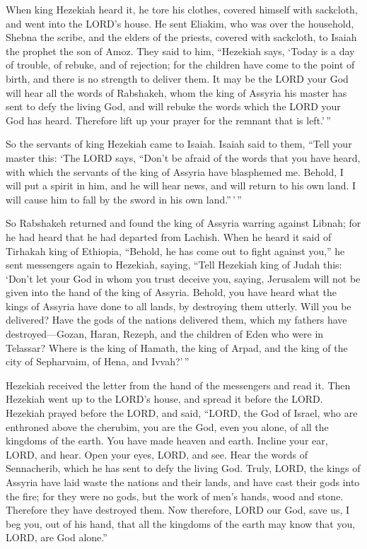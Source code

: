  When king Hezekiah heard it, he tore his clothes, covered
himself with sackcloth, and went into the LORD's house. 
He sent Eliakim, who was over the household, Shebna the scribe, and the
elders of the priests, covered with sackcloth, to Isaiah the prophet the
son of Amoz.  They said to him, ``Hezekiah says, `Today is
a day of trouble, of rebuke, and of rejection; for the children have
come to the point of birth, and there is no strength to deliver them.
 It may be the LORD your God will hear all the words of
Rabshakeh, whom the king of Assyria his master has sent to defy the
living God, and will rebuke the words which the LORD your God has heard.
Therefore lift up your prayer for the remnant that is left.'\,''

 So the servants of king Hezekiah came to Isaiah.
 Isaiah said to them, ``Tell your master this: `The LORD
says, ``Don't be afraid of the words that you have heard, with which the
servants of the king of Assyria have blasphemed me. 
Behold, I will put a spirit in him, and he will hear news, and will
return to his own land. I will cause him to fall by the sword in his own
land.''\,'\,''

 So Rabshakeh returned and found the king of Assyria
warring against Libnah; for he had heard that he had departed from
Lachish.  When he heard it said of Tirhakah king of
Ethiopia, ``Behold, he has come out to fight against you,'' he sent
messengers again to Hezekiah, saying,  ``Tell Hezekiah
king of Judah this: `Don't let your God in whom you trust deceive you,
saying, Jerusalem will not be given into the hand of the king of
Assyria.  Behold, you have heard what the kings of
Assyria have done to all lands, by destroying them utterly. Will you be
delivered?  Have the gods of the nations delivered them,
which my fathers have destroyed---Gozan, Haran, Rezeph, and the children
of Eden who were in Telassar?  Where is the king of
Hamath, the king of Arpad, and the king of the city of Sepharvaim, of
Hena, and Ivvah?'\,''

 Hezekiah received the letter from the hand of the
messengers and read it. Then Hezekiah went up to the LORD's house, and
spread it before the LORD.  Hezekiah prayed before the
LORD, and said, ``LORD, the God of Israel, who are enthroned above the
cherubim, you are the God, even you alone, of all the kingdoms of the
earth. You have made heaven and earth.  Incline your ear,
LORD, and hear. Open your eyes, LORD, and see. Hear the words of
Sennacherib, which he has sent to defy the living God. 
Truly, LORD, the kings of Assyria have laid waste the nations and their
lands,  and have cast their gods into the fire; for they
were no gods, but the work of men's hands, wood and stone. Therefore
they have destroyed them.  Now therefore, LORD our God,
save us, I beg you, out of his hand, that all the kingdoms of the earth
may know that you, LORD, are God alone.''

